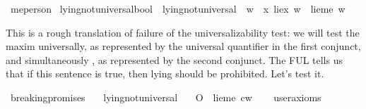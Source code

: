 \begin{isabellebody}
\isamarkupfalse%
\ me{\isacharcolon}{\isacharcolon}{\isachardoublequoteopen}person{\isachardoublequoteclose}\isanewline
%
\isanewline
\isanewline
{}\isamarkupfalse%
\ lying{\isacharunderscore}not{\isacharunderscore}universal{\isacharcolon}{\isacharcolon}{\isachardoublequoteopen}bool{\isachardoublequoteclose}\ \ {\isachardoublequoteopen}lying{\isacharunderscore}not{\isacharunderscore}universal\ {\isasymequiv}\ {\isasymforall}w{\isachardot}\ {\isasymnot}\ {\isacharparenleft}{\isacharparenleft}{\isasymforall}x{\isachardot}\ lie{\isacharparenleft}x{\isacharparenright}\ w{\isacharparenright}\ {\isasymand}\ {\isacharparenleft}lie{\isacharparenleft}me{\isacharparenright}\ w{\isacharparenright}{\isacharparenright}{\isachardoublequoteclose}%
\begin{isamarkuptext}%
This is a rough translation of failure of the universalizability test: we will test the maxim universally,
as represented by the universal quantifier in the first conjunct, and simultaneously \cite{simul}, as represented by 
the second conjunct. The FUL tells us that if this sentence is true, then lying should be prohibited. 
Let's test it.%
\end{isamarkuptext}\isamarkuptrue%
\isamarkupfalse%
\ breaking{\isacharunderscore}promises{\isacharcolon}\isanewline
\ \ \ lying{\isacharunderscore}not{\isacharunderscore}universal\isanewline
\ \ \ {\isachardoublequoteopen}{\isacharparenleft}O\ {\isacharbraceleft}\isactrlbold {\isasymnot}\ {\isacharparenleft}lie{\isacharparenleft}me{\isacharparenright}{\isacharparenright}{\isacharbraceright}{\isacharparenright}\ cw{\isachardoublequoteclose}\isanewline
\ \ \isamarkupfalse%
\ {\isacharbrackleft}user{\isacharunderscore}axioms{\isacharbrackright}\isanewline
%
\isadelimproof
\ \ %
\endisadelimproof
%
\isatagproof
{}\isamarkupfalse%
\isanewline
%
\end{isabellebody}
